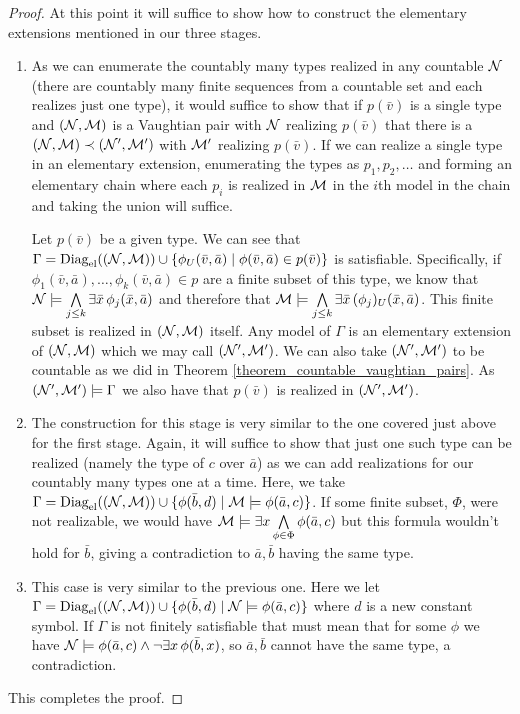 \begin{proof}
At this point it will suffice to show how to construct the elementary extensions mentioned in our three stages. 

\begin{enumerate}
\item As we can enumerate the countably many types realized in any countable \(\mathcal{N}\) (there are countably many finite sequences from a countable set and each realizes just one type), it would suffice to show that if \(p(\bar{v})\) is a single type and \((\mathcal{N}, \mathcal{M})\) is a Vaughtian pair with \(\mathcal{N}\) realizing \(p(\bar{v})\) that there is a \((\mathcal{N}, \mathcal{M}) \prec (\mathcal{N}', \mathcal{M}')\) with \(\mathcal{M}'\) realizing \(p(\bar{v})\). 
If we can realize a single type in an elementary extension, enumerating the types as \(p_1, p_2, \ldots\) and forming an elementary chain where each \(p_i\) is realized in \(\mathcal{M}\) in the \(i\)th model in the chain and taking the union will suffice.

Let \(p(\bar{v})\) be a given type. 
We can see that \(\Gamma = \text{Diag}_\text{el}((\mathcal{N}, \mathcal{M})) \cup \{\phi_U(\bar{v}, \bar{a}) \mid \phi(\bar{v}, \bar{a}) \in  p(\bar{v})\}\) is satisfiable.  
Specifically, if \(\phi_1(\bar{v}, \bar{a}), \ldots, \phi_k(\bar{v}, \bar{a}) \in p\) are a finite subset of this type, we know that \(\mathcal{N} \models \bigwedge\limits_{j \leq k} \exists \bar{x}\, \phi_j(\bar{x},\bar{a})\) and therefore that \(\mathcal{M} \models \bigwedge\limits_{j \leq k} \exists \bar{x} \, (\phi_j)_U(\bar{x},\bar{a})\). 
This finite subset is realized in \((\mathcal{N}, \mathcal{M})\) itself. 
Any model of \(\Gamma\) is an elementary extension of \((\mathcal{N}, \mathcal{M})\) which we may call \((\mathcal{N}', \mathcal{M}')\).
We can also take \((\mathcal{N}', \mathcal{M}')\) to be countable as we did in Theorem \ref{theorem_countable_vaughtian_pairs}. 
As \((\mathcal{N}', \mathcal{M}') \models \Gamma\) we also have that \(p(\bar{v})\) is realized in \((\mathcal{N}', \mathcal{M}')\). 

\item The construction for this stage is very similar to the one covered just above for the first stage.
Again, it will suffice to show that just one such type can be realized (namely the type of \(c\) over \(\bar{a}\)) as we can add realizations for our countably many types one at a time. 
Here, we take \(\Gamma = \text{Diag}_\text{el}((\mathcal{N}, \mathcal{M})) \cup \{\phi(\bar{b}, d) \mid \mathcal{M} \models \phi(\bar{a}, c)\}\). 
If some finite subset, \(\Phi\), were not realizable, we would have \(\mathcal{M} \models \exists x \bigwedge\limits_{\phi \in \Phi}\phi(\bar{a}, c)\) but this formula wouldn't hold for \(\bar{b}\), giving a contradiction to \(\bar{a}, \bar{b}\) having the same type. 

\item This case is very similar to the previous one. Here we let \(\Gamma = \text{Diag}_\text{el}((\mathcal{N}, \mathcal{M})) \cup \{\phi(\bar{b}, d) \mid \mathcal{N} \models \phi(\bar{a}, c)\}\) where \(d\) is a new constant symbol.
If \(\Gamma\) is not finitely satisfiable that must mean that for some \(\phi\) we have \(\mathcal{N} \models \phi(\bar{a}, c) \land \neg \exists x \, \phi(\bar{b}, x)\), 
so \(\bar{a}, \bar{b}\) cannot have the same type, a contradiction.
\end{enumerate}
This completes the proof. 
\end{proof}

